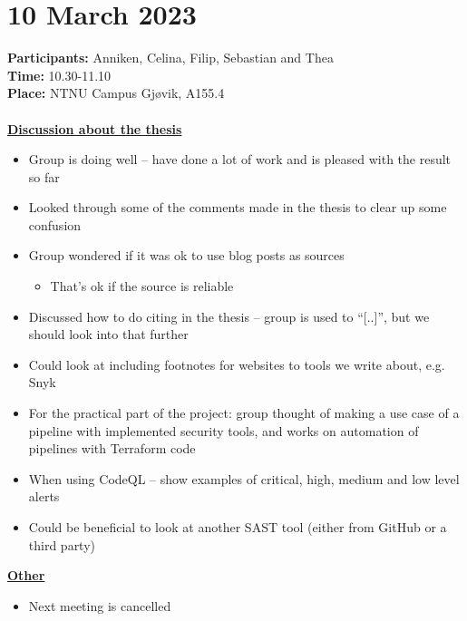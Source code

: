 \section{10 March 2023}
\textbf{Participants:} Anniken, Celina, Filip, Sebastian and Thea\\
\textbf{Time:} 10.30-11.10 \\
\textbf{Place:} NTNU Campus Gjøvik, A155.4
\\~\\


\textbf{\underline{Discussion about the thesis}}
\begin{itemize}
    \item Group is doing well – have done a lot of work and is pleased with the result so far 
    \item Looked through some of the comments made in the thesis to clear up some confusion
    \item Group wondered if it was ok to use blog posts as sources 
        \begin{itemize}
            \item That’s ok if the source is reliable 
        \end{itemize}
    \item Discussed how to do citing in the thesis – group is used to “[..]”, but we should look into that further
    \item Could look at including footnotes for websites to tools we write about, e.g. Snyk 
    \item For the practical part of the project: group thought of making a use case of a pipeline with implemented security tools, and works on automation of pipelines with Terraform code 
    \item When using CodeQL – show examples of critical, high, medium and low level alerts 
    \item Could be beneficial to look at another SAST tool (either from GitHub or a third party) 
\end{itemize}

\textbf{\underline{Other}}
\begin{itemize}
    \item Next meeting is cancelled  
\end{itemize}
